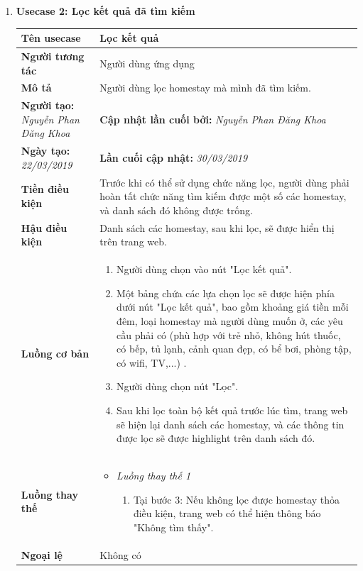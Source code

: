 \begin{enumerate}[label=\textbf{(\alph*)}]
	\item \textbf{Usecase 2: Lọc kết quả đã tìm kiếm}
	\begin{center}
		\begin{longtable}{ | l |p{10cm}|}
			\hline
			\textbf{Tên usecase} & Lọc kết quả \\ \hline
			\textbf{Người tương tác} & Người dùng ứng dụng \\ \hline   
			\textbf{Mô tả} & Người dùng lọc homestay mà mình đã tìm kiếm. \\ \hline  
			\textbf{Người tạo:} \textit{Nguyễn Phan Đăng Khoa} & \textbf{Cập nhật lần cuối bởi:} \textit{Nguyễn Phan Đăng Khoa} \\ \hline
			\textbf{Ngày tạo:} \textit{22/03/2019} & \textbf{Lần cuối cập nhật:} \textit{30/03/2019} \\ \hline
			\textbf{Tiền điều kiện} & Trước khi có thể sử dụng chức năng lọc, người dùng phải hoàn tất chức năng tìm kiếm được một số các homestay, và danh sách đó không được trống.  \\ \hline 
			\textbf{Hậu điều kiện} & Danh sách các homestay, sau khi lọc, sẽ được hiển thị trên trang web. \\ \hline 
			\textbf{Luồng cơ bản} & 
			\begin{enumerate}
				\item Người dùng chọn vào nút "Lọc kết quả".
				\item Một bảng chứa các lựa chọn lọc sẽ được hiện phía dưới nút "Lọc kết quả", bao gồm khoảng giá tiền mỗi đêm, loại homestay mà người dùng muốn ở, các yêu cầu phải có (phù hợp với trẻ nhỏ, không hút thuốc, có bếp, tủ lạnh, cảnh quan đẹp, có bể bơi, phòng tập, có wifi, TV,...) .
				\item Người dùng chọn nút "Lọc".
				\item Sau khi lọc toàn bộ kết quả trước lúc tìm, trang web sẽ hiện lại danh sách các homestay, và các thông tin được lọc sẽ được highlight trên danh sách đó.
			\end{enumerate} \\ \hline 
			\textbf{Luồng thay thế} & 
			\begin{itemize} 
				\item \textit{Luồng thay thế 1}
				\begin{enumerate}
					\item Tại bước 3: Nếu không lọc được homestay thỏa điều kiện, trang web có thể hiện thông báo "Không tìm thấy".
				\end{enumerate}
			\end{itemize} \\ \hline 
			\textbf{Ngoại lệ}  & Không có \\
			\hline
		\end{longtable}
	\end{center}
\end{enumerate}


